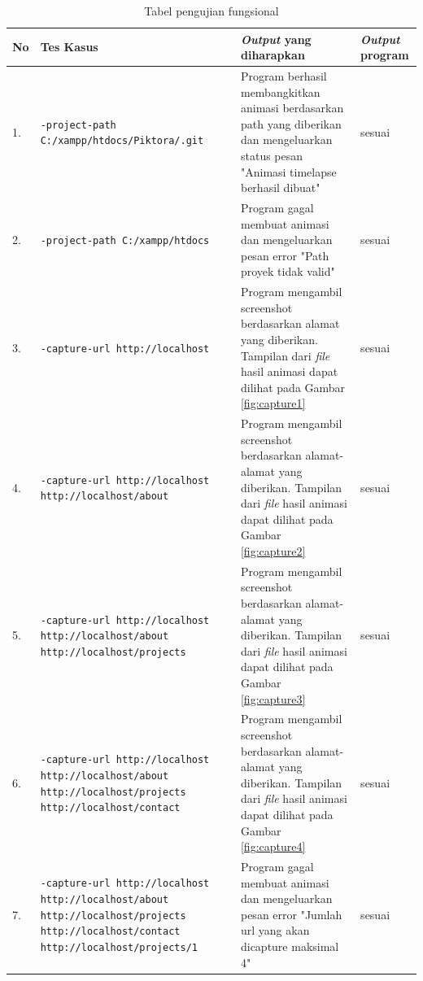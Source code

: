 \begin{table}[htbp]
	\centering
	\caption{Tabel pengujian fungsional}
	
		\begin{tabular}{|p{0.3cm}| p{5 cm}| p{7.3 cm}| p{3 cm}|} \hline
		No & Tes Kasus	& \textit{Output} yang diharapkan & \textit{Output} program \\ \hline
		1. & \texttt{-project-path C:/xampp/htdocs/Piktora/.git} & Program berhasil membangkitkan animasi berdasarkan path yang diberikan dan mengeluarkan status pesan "Animasi timelapse berhasil dibuat" & sesuai \\ \hline
		2. & \texttt{-project-path C:/xampp/htdocs}  & Program gagal membuat animasi dan mengeluarkan pesan error "Path proyek tidak valid"  & sesuai \\ \hline
		3. & \texttt{-capture-url http://localhost} & Program mengambil screenshot berdasarkan alamat yang diberikan. Tampilan dari \textit{file} hasil animasi dapat dilihat pada Gambar \ref{fig:capture1}  & sesuai	\\ \hline
		4. & \texttt{-capture-url http://localhost http://localhost/about} & Program mengambil screenshot berdasarkan alamat-alamat yang diberikan. Tampilan dari \textit{file} hasil animasi dapat dilihat pada Gambar \ref{fig:capture2}  & sesuai \\ \hline
		5. & \texttt{-capture-url http://localhost http://localhost/about http://localhost/projects} & Program mengambil screenshot berdasarkan alamat-alamat yang diberikan. Tampilan dari \textit{file} hasil animasi dapat dilihat pada Gambar \ref{fig:capture3}   & sesuai\\ \hline
		6. & \texttt{-capture-url http://localhost http://localhost/about http://localhost/projects http://localhost/contact} & Program mengambil screenshot berdasarkan alamat-alamat yang diberikan. Tampilan dari \textit{file} hasil animasi dapat dilihat pada Gambar \ref{fig:capture4}  & sesuai \\ \hline
		7. & \texttt{-capture-url http://localhost http://localhost/about http://localhost/projects http://localhost/contact http://localhost/projects/1}& Program gagal membuat animasi dan mengeluarkan pesan error "Jumlah url yang akan dicapture maksimal 4" & sesuai \\ \hline
		

\end{tabular}
\end{table}

